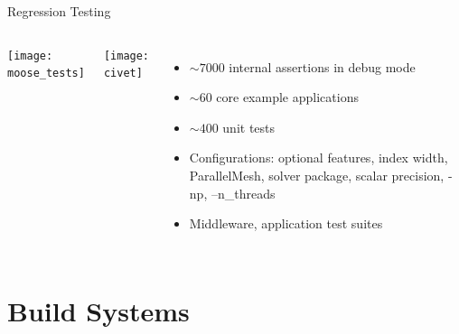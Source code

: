 \documentclass[mathserif]{beamer}
\begin{document}
\begin{frame}[t]{Regression Testing}
  \begin{columns}
    \texttt{[image: moose\_tests]}

    \texttt{[image: civet]}
    \begin{itemize}
    \item $\sim 7000$ internal assertions in debug mode
    \item $\sim 60$ core example applications 
    \item $\sim 400$ unit tests
    \item Configurations: optional features, index width, ParallelMesh,
                          solver package, scalar precision, -np, --n\_threads
    \item Middleware, application test suites
    \end{itemize}
  \end{columns}
\end{frame}


\section{Build Systems}
\end{document}

